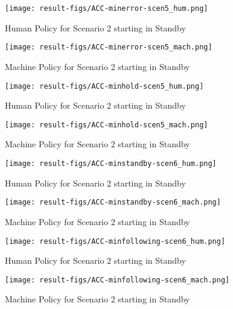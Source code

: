 \begin{figure}[h]
    \texttt{[image: result-figs/ACC-minerror-scen5\_hum.png]}
    \caption{Human Policy for Scenario 2 starting in Standby}
    \label{fig:error-s5-hum}
\end{figure}

\begin{figure}[h]
    \texttt{[image: result-figs/ACC-minerror-scen5\_mach.png]}
    \caption{Machine Policy for Scenario 2 starting in Standby}
    \label{fig:error-s5-mach}
\end{figure}

\begin{figure}[h]
    \texttt{[image: result-figs/ACC-minhold-scen5\_hum.png]}
    \caption{Human Policy for Scenario 2 starting in Standby}
    \label{fig:hold-s5-hum}
\end{figure}

\begin{figure}[h]
    \texttt{[image: result-figs/ACC-minhold-scen5\_mach.png]}
    \caption{Machine Policy for Scenario 2 starting in Standby}
    \label{fig:hold-s5-mach}
\end{figure}

\begin{figure}[h]
    \texttt{[image: result-figs/ACC-minstandby-scen6\_hum.png]}
    \caption{Human Policy for Scenario 2 starting in Standby}
    \label{fig:standby-s6-hum}
\end{figure}

\begin{figure}[h]
    \texttt{[image: result-figs/ACC-minstandby-scen6\_mach.png]}
    \caption{Machine Policy for Scenario 2 starting in Standby}
    \label{fig:standby-s6-mach}
\end{figure}

\begin{figure}[h]
    \texttt{[image: result-figs/ACC-minfollowing-scen6\_hum.png]}
    \caption{Human Policy for Scenario 2 starting in Standby}
    \label{fig:following-s6-hum}
\end{figure}

\begin{figure}[h]
    \texttt{[image: result-figs/ACC-minfollowing-scen6\_mach.png]}
    \caption{Machine Policy for Scenario 2 starting in Standby}
    \label{fig:following-s6-mach}
\end{figure}

